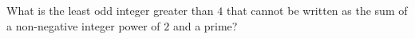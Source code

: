 What is the least odd integer greater than $4$ that cannot be written as the sum of a non-negative integer power of $2$ and a prime?
